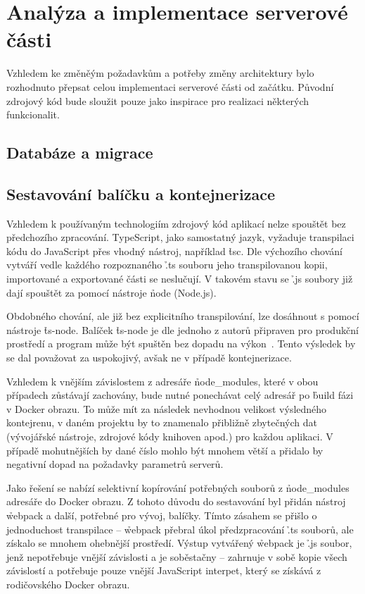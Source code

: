 \chapter{Analýza a implementace serverové části}\label{ch:server}


Vzhledem ke změněým požadavkům a potřeby změny architektury bylo rozhodnuto přepsat celou implementaci serverové části od začátku.
Původní zdrojový kód bude sloužit pouze jako inspirace pro realizaci některých funkcionalit.



\section{Databáze a migrace}\label{sec:server-db}



\section{Sestavování balíčku a kontejnerizace}\label{sec:server-compile}

Vzhledem k používaným technologiím zdrojový kód aplikací nelze spouštět bez předchozího zpracování.
TypeScript, jako samostatný jazyk, vyžaduje transpilaci kódu do JavaScript přes vhodný nástroj, například \h{tsc}.
Dle výchozího chování vytváří vedle každého rozpoznaného \h{.ts} souboru jeho transpilovanou kopii, importované a exportované části se neslučují.
V takovém stavu se \h{.js} soubory již dají spouštět za pomocí nástroje \h{node} (Node.js).

Obdobného chování, ale již bez explicitního transpilování, lze dosáhnout s pomocí nástroje \h{ts-node}.
Balíček \h{ts-node} je dle jednoho z autorů připraven pro produkční prostředí a program může být spuštěn bez dopadu na výkon~\cite{tsnodeprod}.
Tento výsledek by se dal považovat za uspokojivý, avšak ne v případě kontejnerizace.

Vzhledem k vnějším závislostem z adresáře \h{node\_modules}, které v obou případech zůstávají zachovány, bude nutné ponechávat celý adresář po \h{build} fázi v Docker obrazu.
To může mít za následek nevhodnou velikost výsledného kontejrenu, v daném projektu by to znamenalo přibližně  zbytečných dat (vývojářské nástroje, zdrojové kódy knihoven apod.) pro každou aplikaci.
V případě mohutnějších  by dané číslo mohlo být mnohem větší a přidalo by negativní dopad na požadavky parametrů serverů.

Jako řešení se nabízí selektivní kopírování potřebných souborů z \h{node\_modules} adresáře do Docker obrazu.
Z tohoto důvodu do sestavování  byl přidán nástroj \h{webpack} a další, potřebné pro vývoj, balíčky.
Tímto zásahem se přišlo o jednoduchost transpilace – \h{webpack} přebral úkol předzpracování \h{.ts} souborů, ale získalo se mnohem ohebnější prostředí.
Výstup vytvářený \h{webpack} je \h{.js} soubor, jenž nepotřebuje vnější závislosti a je soběstačny – zahrnuje v sobě kopie všech závislostí a potřebuje pouze vnější JavaScript interpet, který se získává z rodičovského Docker obrazu.


